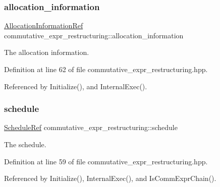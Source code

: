 \subsubsection{\texorpdfstring{allocation\+\_\+information}{allocation\_information}}
{\footnotesize\ttfamily \hyperlink{allocation__information_8hpp_ad90a86da153cba50cbcefc4679036755}{Allocation\+Information\+Ref} commutative\+\_\+expr\+\_\+restructuring\+::allocation\+\_\+information\hspace{0.3cm}{\ttfamily [private]}}



The allocation information. 



Definition at line 62 of file commutative\+\_\+expr\+\_\+restructuring.\+hpp.



Referenced by Initialize(), and Internal\+Exec().

\mbox{\label{classcommutative__expr__restructuring_ab967d188173d0b831dcfbc13d2c69787}} 
\subsubsection{\texorpdfstring{schedule}{schedule}}
{\footnotesize\ttfamily \hyperlink{schedule_8hpp_af67f402958b3b52a1ec5cc4ce08ae3b9}{Schedule\+Ref} commutative\+\_\+expr\+\_\+restructuring\+::schedule\hspace{0.3cm}{\ttfamily [private]}}



The schedule. 



Definition at line 59 of file commutative\+\_\+expr\+\_\+restructuring.\+hpp.



Referenced by Initialize(), Internal\+Exec(), and Is\+Comm\+Expr\+Chain().

\mbox{\label{classcommutative__expr__restructuring_acb765c986a56e2f4b9bd8329c73b7187}} 
